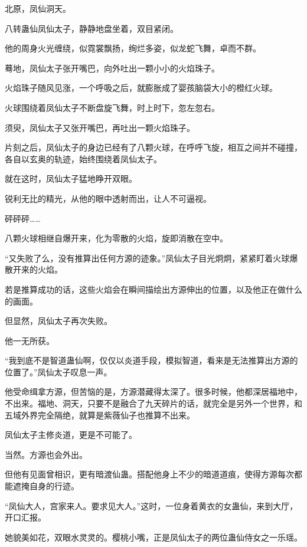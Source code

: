
\begin{this_body}

北原，凤仙洞天。

八转蛊仙凤仙太子，静静地盘坐着，双目紧闭。

他的周身火光缠绕，似霓裳飘扬，绚烂多姿，似龙蛇飞舞，卓而不群。

蓦地，凤仙太子张开嘴巴，向外吐出一颗小小的火焰珠子。

火焰珠子随风见涨，一个呼吸之后，就膨胀成了婴孩脑袋大小的橙红火球。

火球围绕着凤仙太子不断盘旋飞舞，时上时下，忽左忽右。

须臾，凤仙太子又张开嘴巴，再吐出一颗火焰珠子。

片刻之后，凤仙太子的身边已经有了八颗火球，在呼呼飞旋，相互之间并不碰撞，各自以玄奥的轨迹，始终围绕着凤仙太子。

就在这时，凤仙太子猛地睁开双眼。

锐利无比的精光，从他的眼中透射而出，让人不可逼视。

砰砰砰……

八颗火球相继自爆开来，化为零散的火焰，旋即消散在空中。

“又失败了么，没有推算出任何方源的迹象。”凤仙太子目光炯炯，紧紧盯着火球爆散开来的火焰。

若是推算成功的话，这些火焰会在瞬间描绘出方源伸出的位置，以及他正在做什么的画面。

但显然，凤仙太子再次失败。

他一无所获。

“我到底不是智道蛊仙啊，仅仅以炎道手段，模拟智道，看来是无法推算出方源的位置了。”凤仙太子叹息一声。

他受命缉拿方源，但苦恼的是，方源潜藏得太深了。很多时候，他都深居福地中，不出来。福地、洞天，只要不是融合了九天碎片的话，就完全是另外一个世界，和五域外界完全隔绝，就算是紫薇仙子也推算不出来。

凤仙太子主修炎道，更是不可能了。

当然。方源也会外出。

但他有见面曾相识，更有暗渡仙蛊。搭配他身上不少的暗道道痕，使得方源每次都能遮掩自身的行迹。

“凤仙大人，宫家来人。要求见大人。”这时，一位身着黄衣的女蛊仙，来到大厅，开口汇报。

她貌美如花，双眼水灵灵的。樱桃小嘴，正是凤仙太子的两位蛊仙侍女之一乐瑶。


\end{this_body}
